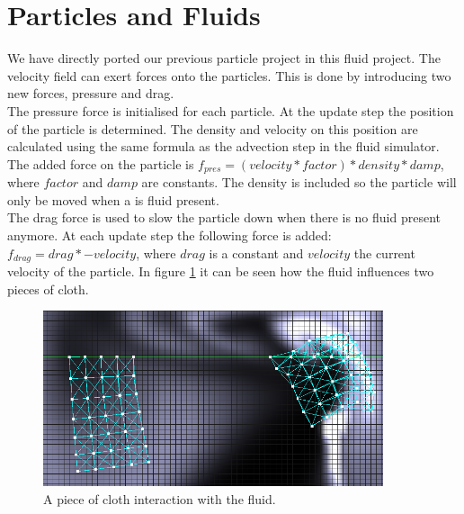 \section{Particles and Fluids}
We have directly ported our previous particle project in this fluid project. The velocity field can exert forces onto the particles. This is done by introducing two new forces, pressure and drag.\\
The pressure force is initialised for each particle. At the update step the position of the particle is determined. The density and velocity on this position are calculated using the same formula as the advection step in the fluid simulator. The added force on the particle is $ f_{pres} = (velocity*factor) * density * damp$, where $factor$ and $damp$ are constants. The density is included so the particle will only be moved when a is fluid present.\\
The drag force is used to slow the particle down when there is no fluid present anymore. At each update step the following force is added: $f_{drag} = drag * -velocity$, where $drag$ is a constant and $velocity$ the current velocity of the particle. In figure \ref{fig:cloth} it can be seen how the fluid influences two pieces of cloth.

\begin{figure}[!htb]
    \centering
    \includegraphics[width=10cm]{img/cloth.png}
    \caption{A piece of cloth interaction with the fluid.}
    \label{fig:cloth}
\end{figure}

